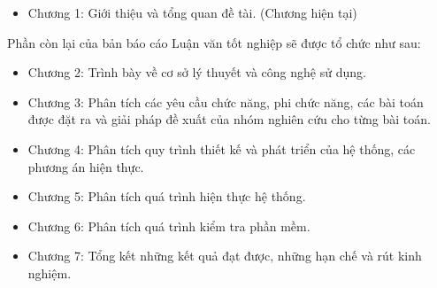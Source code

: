 \begin{itemize}
  \item Chương 1: Giới thiệu và tổng quan đề tài. (Chương hiện tại)
\end{itemize}
Phần còn lại của bản báo cáo Luận văn tốt nghiệp sẽ được tổ chức như sau:
\begin{itemize}
  \item Chương 2: Trình bày về cơ sở lý thuyết và công nghệ sử dụng.
  \item Chương 3: Phân tích các yêu cầu chức năng, phi chức năng, các bài toán được đặt ra và giải pháp đề xuất của nhóm nghiên cứu cho từng bài toán.
  \item Chương 4: Phân tích quy trình thiết kế và phát triển của hệ thống, các phương án hiện thực.
  \item Chương 5: Phân tích quá trình hiện thực hệ thống.
  \item Chương 6: Phân tích quá trình kiểm tra phần mềm.
  \item Chương 7: Tổng kết những kết quả đạt được, những hạn chế và rút kinh nghiệm.
\end{itemize}